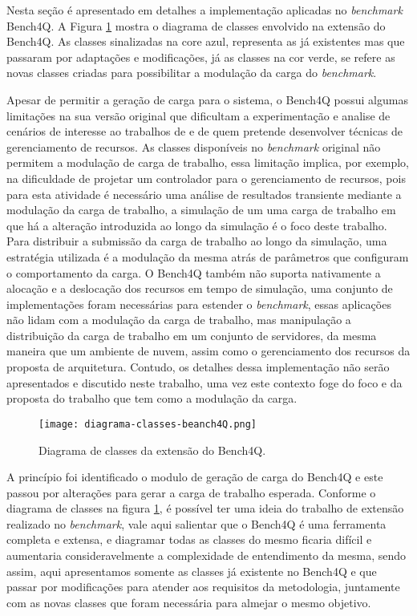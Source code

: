 Nesta seção é apresentado em detalhes a implementação aplicadas no \textit{benchmark} Bench4Q. A Figura \ref{fig:diagrama-classes} mostra o diagrama de classes envolvido na extensão do Bench4Q. As classes sinalizadas na core azul, representa as já existentes mas que passaram por adaptações e modificações, já as classes na cor verde, se refere as novas classes criadas para possibilitar a modulação da carga do \textit{benchmark}.

Apesar de permitir a geração de carga para o sistema, o Bench4Q possui algumas limitações na sua versão original que dificultam a experimentação e analise de cenários de interesse ao trabalhos de  e  de quem pretende desenvolver técnicas de gerenciamento de recursos.
As classes disponíveis no \textit{benchmark} original não permitem a modulação de carga de trabalho, essa limitação implica, por exemplo, na dificuldade de projetar um controlador para o gerenciamento de recursos, pois para esta atividade é necessário uma análise de resultados transiente mediante a modulação da carga de trabalho, a simulação de um uma carga de trabalho em que há a alteração introduzida ao longo da simulação é o foco deste trabalho.
Para distribuir a submissão da carga de trabalho ao longo da simulação, uma estratégia utilizada é a modulação da mesma atrás de parâmetros que configuram o comportamento da carga. O Bench4Q também não suporta nativamente a alocação e a deslocação dos recursos em tempo de simulação, uma conjunto de implementações foram necessárias para estender o \textit{benchmark}, essas aplicações não lidam com a modulação da carga de trabalho, mas manipulação a distribuição da carga de trabalho em um conjunto de servidores, da mesma maneira que um ambiente de nuvem, assim como o gerenciamento dos recursos da proposta de arquitetura. Contudo, os detalhes dessa implementação não serão apresentados e discutido neste trabalho, uma vez este contexto foge do foco e da proposta do trabalho que tem como a modulação da carga.

\begin{figure}[htb]
	\centering
	\texttt{[image: diagrama-classes-beanch4Q.png]}	
	\caption{Diagrama de classes da extensão do Bench4Q.}
	\label{fig:diagrama-classes}
	\fautor
\end{figure}


A princípio foi identificado o modulo de geração de carga do Bench4Q e este passou por alterações para gerar a carga de trabalho esperada. Conforme o diagrama de classes na figura \ref{fig:diagrama-classes}, é possível ter uma ideia do trabalho de extensão realizado no \textit{benchmark}, vale aqui salientar que o Bench4Q é uma ferramenta completa e extensa, e diagramar todas as classes do mesmo ficaria difícil e aumentaria consideravelmente a complexidade de entendimento da mesma, sendo assim, aqui apresentamos somente as classes já existente no Bench4Q e que passar por modificações para atender aos requisitos da metodologia, juntamente com as novas classes que foram necessária para almejar o mesmo objetivo.

